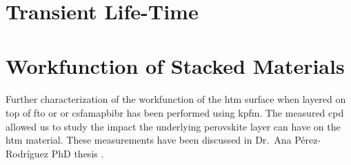 \paragraph{}

\section{Transient Life-Time}

\paragraph{}

\section{Workfunction of Stacked Materials}

\paragraph{}
Further characterization of the workfunction of the \gls{htm} surface when layered on top of \gls{fto} or  or \gls{csfamapbibr} has been performed using \gls{kpfm}.
The measured \gls{cpd} allowed us to study the impact the underlying perovskite layer can have on the \gls{htm} material.
These measurements have been discussed in Dr.\ Ana Pérez-Rodríguez PhD thesis \cite{Perez-Rodriguez2018}.

